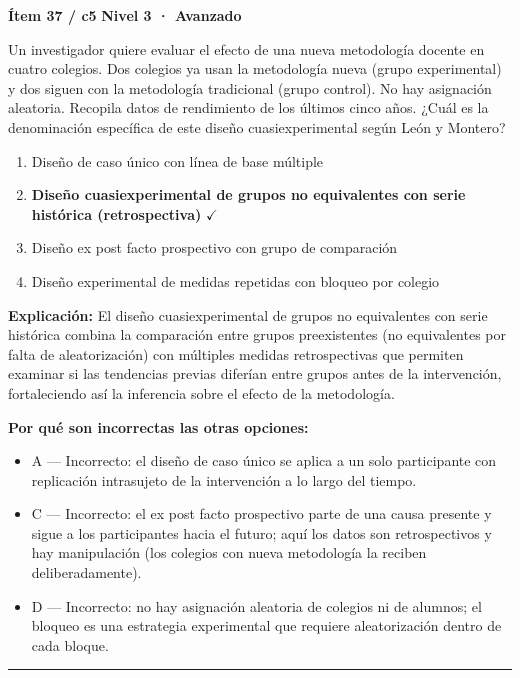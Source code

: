 \documentclass[12pt,a4paper]{article}
\begin{document}
\begin{mdframed}[backgroundcolor=fondogris,linecolor=rojo,linewidth=1pt,innerleftmargin=10pt,innerrightmargin=10pt,innertopmargin=7pt,innerbottommargin=7pt]
\textbf{Ítem 37 / c5} \hfill {\small\bfseries\color{rojo} Nivel 3 · Avanzado}
\end{mdframed}

Un investigador quiere evaluar el efecto de una nueva metodología docente en cuatro colegios. Dos colegios ya usan la metodología nueva (grupo experimental) y dos siguen con la metodología tradicional (grupo control). No hay asignación aleatoria. Recopila datos de rendimiento de los últimos cinco años. ¿Cuál es la denominación específica de este diseño cuasiexperimental según León y Montero?

\begin{enumerate}
  \item[A.] Diseño de caso único con línea de base múltiple
  \item[\textbf{\color{verde}B.}] \textbf{\color{verde} Diseño cuasiexperimental de grupos no equivalentes con serie histórica (retrospectiva)} \hfill $\checkmark$
  \item[C.] Diseño ex post facto prospectivo con grupo de comparación
  \item[D.] Diseño experimental de medidas repetidas con bloqueo por colegio
\end{enumerate}

\noindent\textbf{\color{azul}Explicación:} El diseño cuasiexperimental de grupos no equivalentes con serie histórica combina la comparación entre grupos preexistentes (no equivalentes por falta de aleatorización) con múltiples medidas retrospectivas que permiten examinar si las tendencias previas diferían entre grupos antes de la intervención, fortaleciendo así la inferencia sobre el efecto de la metodología.

\noindent\textbf{\color{gris}Por qué son incorrectas las otras opciones:}
\begin{itemize}
  \item {\small A — Incorrecto: el diseño de caso único se aplica a un solo participante con replicación intrasujeto de la intervención a lo largo del tiempo.}
  \item {\small C — Incorrecto: el ex post facto prospectivo parte de una causa presente y sigue a los participantes hacia el futuro; aquí los datos son retrospectivos y hay manipulación (los colegios con nueva metodología la reciben deliberadamente).}
  \item {\small D — Incorrecto: no hay asignación aleatoria de colegios ni de alumnos; el bloqueo es una estrategia experimental que requiere aleatorización dentro de cada bloque.}
\end{itemize}
\vspace{8pt}\hrule\vspace{10pt}
\end{document}
